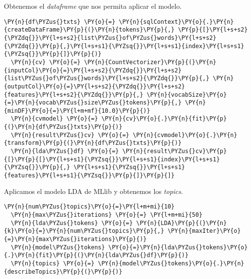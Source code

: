 Obtenemos el \textit{dataframe} que nos permita  aplicar el modelo.

\vspace{0.5cm}

     \begin{tcolorbox}[breakable, size=fbox, boxrule=1pt, pad at break*=1mm,colback=cellbackground, colframe=cellborder]
  \begin{Verbatim}[commandchars=\\\{\}]
  \PY{n}{df\PYZus{}txts} \PY{o}{=} \PY{n}{sqlContext}\PY{o}{.}\PY{n}{createDataFrame}\PY{p}{(}\PY{n}{tokens}\PY{p}{,} \PY{p}{[}\PY{l+s+s2}{\PYZdq{}}\PY{l+s+s2}{list\PYZus{}of\PYZus{}words}\PY{l+s+s2}{\PYZdq{}}\PY{p}{,}\PY{l+s+s1}{\PYZsq{}}\PY{l+s+s1}{index}\PY{l+s+s1}{\PYZsq{}}\PY{p}{]}\PY{p}{)}
  \PY{n}{cv} \PY{o}{=} \PY{n}{CountVectorizer}\PY{p}{(}\PY{n}{inputCol}\PY{o}{=}\PY{l+s+s2}{\PYZdq{}}\PY{l+s+s2}{list\PYZus{}of\PYZus{}words}\PY{l+s+s2}{\PYZdq{}}\PY{p}{,} \PY{n}{outputCol}\PY{o}{=}\PY{l+s+s2}{\PYZdq{}}\PY{l+s+s2}{features}\PY{l+s+s2}{\PYZdq{}}\PY{p}{,} \PY{n}{vocabSize}\PY{o}{=}\PY{n}{vocab\PYZus{}size\PYZus{}tokens}\PY{p}{,} \PY{n}{minDF}\PY{o}{=}\PY{l+m+mf}{10.0}\PY{p}{)}
  \PY{n}{cvmodel} \PY{o}{=} \PY{n}{cv}\PY{o}{.}\PY{n}{fit}\PY{p}{(}\PY{n}{df\PYZus{}txts}\PY{p}{)}
  \PY{n}{result\PYZus{}cv} \PY{o}{=} \PY{n}{cvmodel}\PY{o}{.}\PY{n}{transform}\PY{p}{(}\PY{n}{df\PYZus{}txts}\PY{p}{)}
  \PY{n}{lda\PYZus{}df} \PY{o}{=} \PY{n}{result\PYZus{}cv}\PY{p}{[}\PY{p}{[}\PY{l+s+s1}{\PYZsq{}}\PY{l+s+s1}{index}\PY{l+s+s1}{\PYZsq{}}\PY{p}{,} \PY{l+s+s1}{\PYZsq{}}\PY{l+s+s1}{features}\PY{l+s+s1}{\PYZsq{}}\PY{p}{]}\PY{p}{]}
  \end{Verbatim}
  \end{tcolorbox}
  
  
 Aplicamos el modelo LDA de MLlib y obtenemos los \textit{topics}.
  \vspace{0.5cm}
  
      \begin{tcolorbox}[breakable, size=fbox, boxrule=1pt, pad at break*=1mm,colback=cellbackground, colframe=cellborder]
  \begin{Verbatim}[commandchars=\\\{\}]
  \PY{n}{num\PYZus{}topics}\PY{o}{=}\PY{l+m+mi}{10}
  \PY{n}{max\PYZus{}iterations} \PY{o}{=} \PY{l+m+mi}{50}
  \PY{n}{lda\PYZus{}tokens} \PY{o}{=} \PY{n}{LDA}\PY{p}{(}\PY{n}{k}\PY{o}{=}\PY{n}{num\PYZus{}topics}\PY{p}{,} \PY{n}{maxIter}\PY{o}{=}\PY{n}{max\PYZus{}iterations}\PY{p}{)}
  \PY{n}{model\PYZus{}tokens} \PY{o}{=}\PY{n}{lda\PYZus{}tokens}\PY{o}{.}\PY{n}{fit}\PY{p}{(}\PY{n}{lda\PYZus{}df}\PY{p}{)}
  \PY{n}{topics} \PY{o}{=} \PY{n}{model\PYZus{}tokens}\PY{o}{.}\PY{n}{describeTopics}\PY{p}{(}\PY{p}{)}
  \end{Verbatim}
  \end{tcolorbox}

